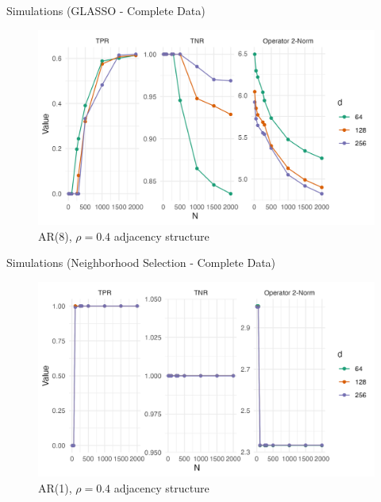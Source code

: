 \documentclass{beamer}
\begin{document}
\begin{frame}{Simulations (GLASSO - Complete Data)}
    \begin{figure}
        \centering 
        \includegraphics[scale=0.65]{glasso_complete_fixN_b8.png}
        \caption{AR(8), $\rho=0.4$ adjacency structure}
    \end{figure}
\end{frame}



\begin{frame}{Simulations (Neighborhood Selection - Complete Data)}
    \begin{figure}
        \centering 
        \includegraphics[scale=0.65]{glasso_complete_fixN_b1mb.png}
        \caption{AR(1), $\rho=0.4$ adjacency structure}
    \end{figure}
\end{frame}
\end{document}
